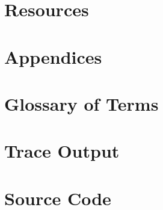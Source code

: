 \chapter{Resources}
\nocite{*}



\chapter{Appendices}
\appendix

\chapter{Glossary of Terms}\label{sec:glosterm}
\printglossaries

\newpage
\chapter{Trace Output}\label{sec:traceout}


\newpage
\chapter{Source Code}\label{sec:srccode}
%



